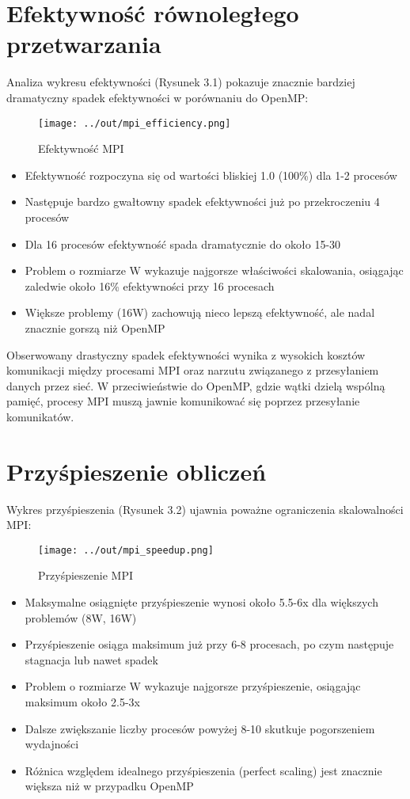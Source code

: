 \documentclass[12pt,a4paper]{report}
\begin{document}
\section{Efektywność równoległego przetwarzania}
Analiza wykresu efektywności (Rysunek 3.1) pokazuje znacznie bardziej dramatyczny spadek efektywności w porównaniu do OpenMP:
\begin{figure}[h]
    \centering
    \texttt{[image: ../out/mpi\_efficiency.png]}
    \caption{Efektywność MPI}
    \label{fig:mpi_efficiency}
\end{figure}
\begin{itemize}
    \item Efektywność rozpoczyna się od wartości bliskiej 1.0 (100\%) dla 1-2 procesów
    \item Następuje bardzo gwałtowny spadek efektywności już po przekroczeniu 4 procesów
    \item Dla 16 procesów efektywność spada dramatycznie do około 15-30%
    \item Problem o rozmiarze W wykazuje najgorsze właściwości skalowania, osiągając zaledwie około 16\% efektywności przy 16 procesach
    \item Większe problemy (16W) zachowują nieco lepszą efektywność, ale nadal znacznie gorszą niż OpenMP
\end{itemize}

Obserwowany drastyczny spadek efektywności wynika z wysokich kosztów komunikacji między procesami MPI oraz narzutu związanego z przesyłaniem danych przez sieć. W przeciwieństwie do OpenMP, gdzie wątki dzielą wspólną pamięć, procesy MPI muszą jawnie komunikować się poprzez przesyłanie komunikatów.

\section{Przyśpieszenie obliczeń}
Wykres przyśpieszenia (Rysunek 3.2) ujawnia poważne ograniczenia skalowalności MPI:
\begin{figure}[h]
    \centering
    \texttt{[image: ../out/mpi\_speedup.png]}
    \caption{Przyśpieszenie MPI}
    \label{fig:mpi_speedup}
\end{figure}
\begin{itemize}
    \item Maksymalne osiągnięte przyśpieszenie wynosi około 5.5-6x dla większych problemów (8W, 16W)
    \item Przyśpieszenie osiąga maksimum już przy 6-8 procesach, po czym następuje stagnacja lub nawet spadek
    \item Problem o rozmiarze W wykazuje najgorsze przyśpieszenie, osiągając maksimum około 2.5-3x
    \item Dalsze zwiększanie liczby procesów powyżej 8-10 skutkuje pogorszeniem wydajności
    \item Różnica względem idealnego przyśpieszenia (perfect scaling) jest znacznie większa niż w przypadku OpenMP
\end{itemize}
\end{document}
